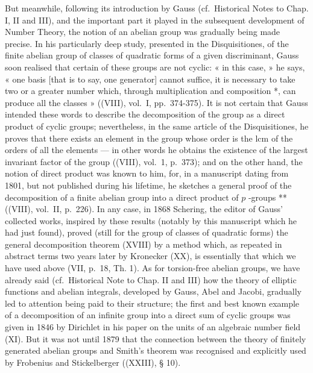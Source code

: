 But meanwhile, following its introduction by Gauss (cf.~Historical Notes to Chap. I, II and III), and the important part it played in the subsequent development of Number Theory, the notion of an abelian group was gradually being made precise. In his particularly deep study, presented in the Disquisitiones, of the finite abelian group of classes of quadratic forms of a given discriminant, Gauss soon realised that certain of these groups are not cyclic: « in this case, » he says, « one basis {[}that is to say, one generator{]} cannot suffice, it is necessary to take two or a greater number which, through multiplication and composition *, can produce all the classes » ((VIII), vol.~I, pp.~374-375). It is not certain that Gauss intended these words to describe the decomposition of the group as a direct product of cyclic groups; nevertheless, in the same article of the Disquisitiones, he proves that there exists an element in the group whose order is the lcm of the orders of all the elements --- in other words he obtains the existence of the largest invariant factor of the group ((VIII), vol.~1, p.~373); and on the other hand, the notion of direct product was known to him, for, in a manuscript dating from 1801, but not published during his lifetime, he sketches a general proof of the decomposition of a finite abelian group into a direct product of \(p\) -groups ** ((VIII), vol.~II, p.~226). In any case, in 1868 Schering, the editor of Gauss' collected works, inspired by these results (notably by this manuscript which he had just found), proved (still for the group of classes of quadratic forms) the general decomposition theorem (XVIII) by a method which, as repeated in abstract terms two years later by Kronecker (XX), is essentially that which we have used above (VII, p.~18, Th. 1). As for torsion-free abelian groups, we have already said (cf.~Historical Note to Chap. II and III) how the theory of elliptic functions and abelian integrals, developed by Gauss, Abel and Jacobi, gradually led to attention being paid to their structure; the first and best known example of a decomposition of an infinite group into a direct sum of cyclic groups was given in 1846 by Dirichlet in his paper on the units of an algebraic number field (XI). But it was not until 1879 that the connection between the theory of finitely generated abelian groups and Smith's theorem was recognised and explicitly used by Frobenius and Stickelberger ((XXIII), § 10).


